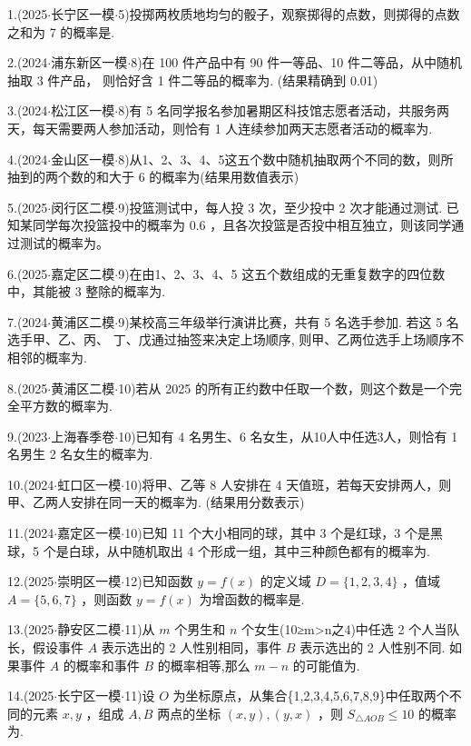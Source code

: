 1.(2025$\cdot$长宁区一模$\cdot$5)投掷两枚质地均匀的骰子，观察掷得的点数，则掷得的点数之和为 7 的概率是\blkda[2]{}.

2.(2024$\cdot$浦东新区一模$\cdot$8)在 100 件产品中有 90 件一等品、10 件二等品，从中随机抽取 3 件产品， 则恰好含 1 件二等品的概率为\blkda[2]{}. (结果精确到 0.01)

3.(2024$\cdot$松江区一模$\cdot$8)有 5 名同学报名参加暑期区科技馆志愿者活动，共服务两天，每天需要两人参加活动，则恰有 1 人连续参加两天志愿者活动的概率为\blkda[2]{}.

4.(2024$\cdot$金山区一模$\cdot$8)从1、2、3、4、5这五个数中随机抽取两个不同的数，则所抽到的两个数的和大于 6 的概率为\blkda[2]{}(结果用数值表示)

5.(2025$\cdot$闵行区二模$\cdot$9)投篮测试中，每人投 3 次，至少投中 2 次才能通过测试. 已知某同学每次投篮投中的概率为 0.6 ，且各次投篮是否投中相互独立，则该同学通过测试的概率为\blkda[2]{}。

6.(2025$\cdot$嘉定区二模$\cdot$9)在由1、2、3、4、5 这五个数组成的无重复数字的四位数中，其能被 3 整除的概率为\blkda[2]{}.

7.(2024$\cdot$黄浦区二模$\cdot$9)某校高三年级举行演讲比赛，共有 5 名选手参加. 若这 5 名选手甲、乙、丙、 丁、戊通过抽签来决定上场顺序, 则甲、乙两位选手上场顺序不相邻的概率为\blkda[2]{}.

8.(2025$\cdot$黄浦区二模$\cdot$10)若从 2025 的所有正约数中任取一个数，则这个数是一个完全平方数的概率为\blkda[2]{}.

9.(2023$\cdot$上海春季卷$\cdot$10)已知有 4 名男生、6 名女生，从10人中任选3人，则恰有 1 名男生 2 名女生的概率为\blkda[2]{}.

10.(2024$\cdot$虹口区一模$\cdot$10)将甲、乙等 8 人安排在 4 天值班，若每天安排两人，则甲、乙两人安排在同一天的概率为\blkda[2]{}. (结果用分数表示)

11.(2024$\cdot$嘉定区一模$\cdot$10)已知 11 个大小相同的球，其中 3 个是红球，3 个是黑球，5 个是白球，从中随机取出 4 个形成一组，其中三种颜色都有的概率为\blkda[2]{}.

12.(2025$\cdot$崇明区一模$\cdot$12)已知函数 $y = f\left( x\right)$ 的定义域 $D = \{ 1,2,3,4\}$ ，值域 $A = \{ 5,6,7\}$ ，则函数 $y = f\left( x\right)$ 为增函数的概率是\blkda[2]{}.

13.(2025$\cdot$静安区二模$\cdot$11)从 $m$ 个男生和 $n$ 个女生(10≥m>n之4)中任选 2 个人当队长，假设事件 $A$ 表示选出的 2 人性别相同，事件 $B$ 表示选出的 2 人性别不同. 如果事件 $A$ 的概率和事件 $B$ 的概率相等,那么 $m - n$ 的可能值为\blkda[2]{}.

14.(2025$\cdot$长宁区一模$\cdot$11)设 $O$ 为坐标原点，从集合\{1,2,3,4,5,6,7,8,9\}中任取两个不同的元素 $x,y$ ，组成 $A,B$ 两点的坐标 $\left( {x,y}\right) ,\left( {y,x}\right)$ ，则 ${S}_{\bigtriangleup {AOB}} \leq  {10}$ 的概率为\blkda[2]{}.


